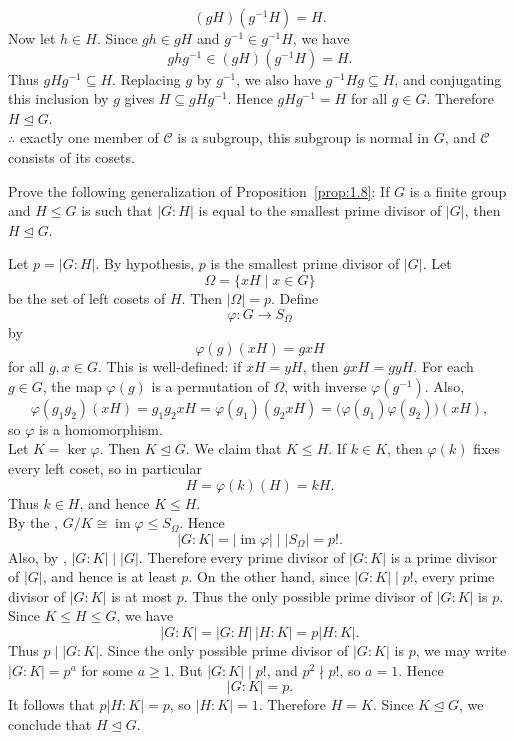 \documentclass[../Odyssey_Project.tex]{subfiles}
\begin{document}
\begin{solution}
\[
    (gH)(g^{-1}H)=H.
\]
Now let \(h \in H\). Since \(gh \in gH\) and \(g^{-1} \in g^{-1}H\), we have
\[
    ghg^{-1} \in (gH)(g^{-1}H)=H.
\]
Thus \(gHg^{-1} \subseteq H\). Replacing \(g\) by \(g^{-1}\), we also have \(g^{-1}Hg \subseteq H\), and conjugating this inclusion by \(g\) gives \(H \subseteq gHg^{-1}\). Hence \(gHg^{-1}=H\) for all \(g \in G\). Therefore \(H \trianglelefteq G\). \\
\(\therefore\) exactly one member of \(\mathcal C\) is a subgroup, this subgroup is normal in \(G\), and \(\mathcal C\) consists of its cosets.
\end{solution}

\begin{exercise}
\label{ex:1.10}
Prove the following generalization of Proposition~\ref{prop:1.8}: If $G$ is a finite group and $H \leq G$ is such that $|G : H|$ is equal to the smallest prime divisor of $|G|$, then $H \trianglelefteq G$.
\end{exercise}
\begin{solution}
Let \(p = |G:H|\). By hypothesis, \(p\) is the smallest prime divisor of \(|G|\). Let
\[
    \Omega = \{xH \mid x \in G\}
\]
be the set of left cosets of \(H\). Then \(|\Omega|=p\). Define
\[
    \varphi \colon G \to S_\Omega
\]
by
\[
    \varphi(g)(xH) = gxH
\]
for all \(g,x \in G\). This is well-defined: if \(xH = yH\), then \(gxH = gyH\). For each \(g \in G\), the map \(\varphi(g)\) is a permutation of \(\Omega\), with inverse \(\varphi(g^{-1})\). Also,
\[
    \varphi(g_1g_2)(xH) = g_1g_2xH
    =
    \varphi(g_1)(g_2xH)
    =
    \bigl(\varphi(g_1)\varphi(g_2)\bigr)(xH),
\]
so \(\varphi\) is a homomorphism. \\
Let \(K = \ker \varphi\). Then \(K \trianglelefteq G\). We claim that \(K \leq H\). If \(k \in K\), then \(\varphi(k)\) fixes every left coset, so in particular
\[
    H = \varphi(k)(H) = kH.
\]
Thus \(k \in H\), and hence \(K \leq H\). \\
By the , \(G/K \cong \operatorname{im}\varphi \leq S_\Omega\). Hence
\[
    |G:K| = |\operatorname{im}\varphi| \mid |S_\Omega| = p!.
\]
Also, by , \(|G:K| \mid |G|\). Therefore every prime divisor of \(|G:K|\) is a prime divisor of \(|G|\), and hence is at least \(p\). On the other hand, since \(|G:K| \mid p!\), every prime divisor of \(|G:K|\) is at most \(p\). Thus the only possible prime divisor of \(|G:K|\) is \(p\). \\
Since \(K \leq H \leq G\), we have
\[
    |G:K| = |G:H|\,|H:K| = p|H:K|.
\]
Thus \(p \mid |G:K|\). Since the only possible prime divisor of \(|G:K|\) is \(p\), we may write \(|G:K|=p^a\) for some \(a \geq 1\). But \(|G:K| \mid p!\), and \(p^2 \nmid p!\), so \(a=1\). Hence
\[
    |G:K|=p.
\]
It follows that \(p|H:K|=p\), so \(|H:K|=1\). Therefore \(H=K\). Since \(K \trianglelefteq G\), we conclude that \(H \trianglelefteq G\).
\end{solution}
\end{document}

